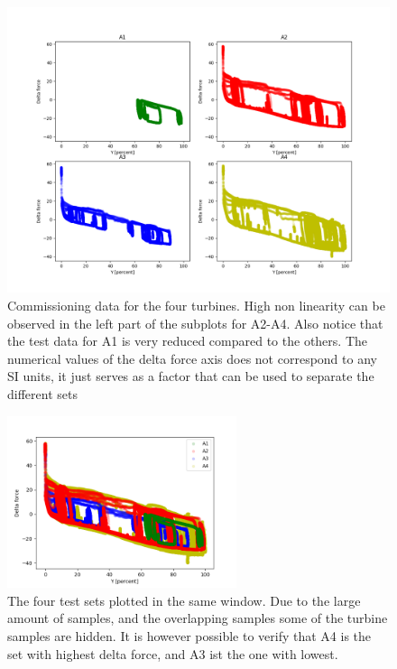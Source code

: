         \begin{figure}[h]
            \centering
            \includegraphics[width = \textwidth]{figures/data/start_up_all.png}
            \caption{Commissioning data for the four turbines. High non linearity can be observed in the left part of the subplots for A2-A4. Also notice that the test data for A1 is very reduced compared to the others. The numerical values of the delta force axis does not correspond to any SI units, it just serves as a factor that can be used to separate the different sets}
            \label{fig:start_up_4}
        \end{figure}
        
        \begin{figure}[h]
            \centering
            \includegraphics[width = 0.6\textwidth]{figures/data/start_up_all_one_plot.png}
            \caption{The four test sets plotted in the same window. Due to the large amount of samples, and the overlapping samples some of the turbine samples are hidden. It is however possible to verify that A4 is the set with highest delta force, and A3 ist the one with lowest.}
            \label{fig:start_up_1}
        \end{figure}
    

